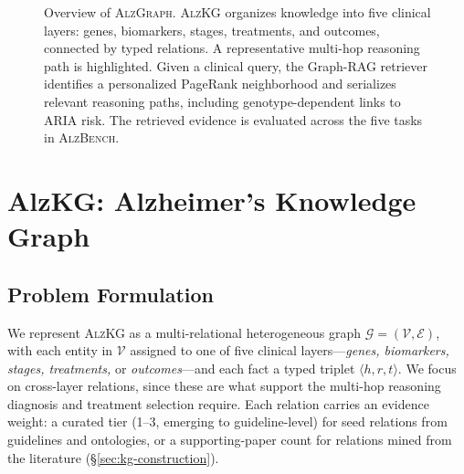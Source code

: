 \documentclass{article}
\begin{document}
\begin{figure}[t]
{%
}
\caption{{Overview of \textsc{AlzGraph}.} \textsc{AlzKG} organizes knowledge into five clinical layers: genes, biomarkers, stages, treatments, and outcomes, connected by typed relations. A representative multi-hop reasoning path is highlighted. Given a clinical query, the Graph-RAG retriever identifies a personalized PageRank neighborhood and serializes relevant reasoning paths, including genotype-dependent links to ARIA risk. The retrieved evidence is evaluated across the five tasks in \textsc{AlzBench}.}
\label{fig:overview}
\end{figure}

\section{AlzKG: Alzheimer's Knowledge Graph}

\subsection{Problem Formulation}

We represent \textsc{AlzKG} as a multi-relational heterogeneous graph $\mathcal{G}=(\mathcal{V},\mathcal{E})$, with each entity in $\mathcal{V}$ assigned to one of five clinical layers---\emph{genes, biomarkers, stages, treatments,} or \emph{outcomes}---and each fact a typed triplet $\langle h,r,t\rangle$. We focus on cross-layer relations, since these are what support the multi-hop reasoning diagnosis and treatment selection require. Each relation carries an evidence weight: a curated tier (1--3, emerging to guideline-level) for seed relations from guidelines and ontologies, or a supporting-paper count for relations mined from the literature (\S\ref{sec:kg-construction}).
\end{document}
